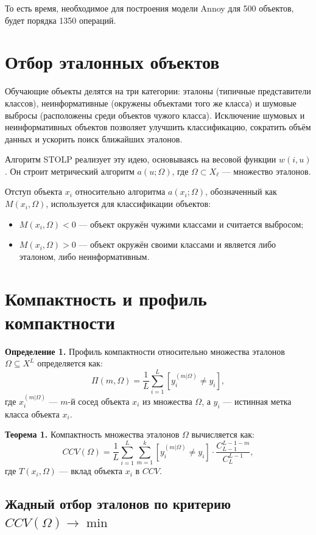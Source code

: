 То есть время, необходимое для построения модели Annoy для 500 объектов, будет порядка 1350 операций.

\section{Отбор эталонных объектов}
Обучающие объекты делятся на три категории: эталоны (типичные представители классов), неинформативные (окружены объектами того же класса) и шумовые выбросы (расположены среди объектов чужого класса). Исключение шумовых и неинформативных объектов позволяет улучшить классификацию, сократить объём данных и ускорить поиск ближайших эталонов.

Алгоритм STOLP реализует эту идею, основываясь на весовой функции \( w(i, u) \). Он строит метрический алгоритм \( a(u; \Omega) \), где \( \Omega \subset X_\ell \) — множество эталонов. 

Отступ объекта \( x_i \) относительно алгоритма \( a(x_i; \Omega) \), обозначенный как \( M(x_i, \Omega) \), используется для классификации объектов:
\begin{itemize}
    \item \( M(x_i, \Omega) < 0 \) — объект окружён чужими классами и считается выбросом;
    \item \( M(x_i, \Omega) > 0 \) — объект окружён своими классами и является либо эталоном, либо неинформативным.
\end{itemize}

\section{Компактность и профиль компактности}

\textbf{Определение 1.} Профиль компактности относительно множества эталонов \( \Omega \subseteq X^L \) определяется как:
\[
\Pi(m, \Omega) = \frac{1}{L} \sum_{i=1}^L \left[ y_i^{(m|\Omega)} \neq y_i \right],
\]
где \( x_i^{(m|\Omega)} \) — \( m \)-й сосед объекта \( x_i \) из множества \( \Omega \), а \( y_i \) — истинная метка класса объекта \( x_i \).


\textbf{Теорема 1.} Компактность множества эталонов \( \Omega \) вычисляется как:
\[
CCV(\Omega) = \frac{1}{L} \sum_{i=1}^L \sum_{m=1}^k \left[ y_i^{(m|\Omega)} \neq y_i \right] \cdot \frac{C_{L-1}^{L-1-m}}{C_L^{L-1}},
\]
где \( T(x_i, \Omega) \) — вклад объекта \( x_i \) в \( CCV \).


\subsection*{Жадный отбор эталонов по критерию $CCV(\Omega) \to \min$}

